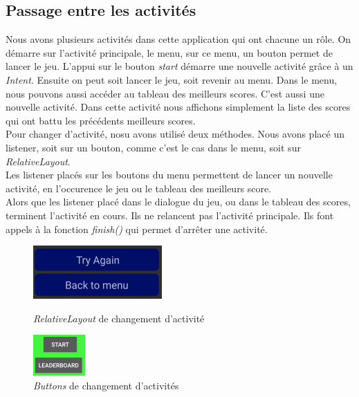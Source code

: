 \documentclass{article}
\begin{document}
\subsection{Passage entre les activités}
Nous avons plusieurs activités dans cette application qui ont chacune un rôle. On démarre sur l'activité principale, le menu, sur ce menu, un bouton permet de lancer le jeu. L'appui sur le bouton \textit{start} démarre une nouvelle activité grâce à un \textit{Intent}. Ensuite on peut soit lancer le jeu, soit revenir au menu. Dans le menu, nous pouvons aussi accéder au tableau des meilleurs scores. C'est aussi une nouvelle activité. Dans cette activité nous affichons simplement la liste des scores qui ont battu les précédents meilleurs scores.\\
Pour changer d'activité, nosu avons utilisé deux méthodes. Nous avons placé un listener, soit sur un bouton, comme c'est le cas dans le menu, soit sur \textit{RelativeLayout}.\\
Les listener placés sur les boutons du menu permettent de lancer un nouvelle activité, en l'occurence le jeu ou le tableau des meilleurs score.\\
Alors que les listener placé dans le dialogue du jeu, ou dans le tableau des scores, terminent l'activité en cours. Ils ne relancent pas l'activité principale. Ils font appels à la fonction \textit{finish()} qui permet d'arrêter une activité.
\begin{figure}[H]
    \centering
    \begin{minipage}[c]{.4\linewidth}
        \centering
        \includegraphics[scale=1]{LayoutChangeActi.png}
        \caption{\textit{RelativeLayout} de changement d'activité}
    \end{minipage} \hfill
    \begin{minipage}[c]{.4\linewidth}
        \centering
        \includegraphics[scale=1.3]{ButtonsChangeActi.png}
        \caption{\textit{Buttons} de changement d'activités}
    \end{minipage}
\end{figure}
\end{document}
